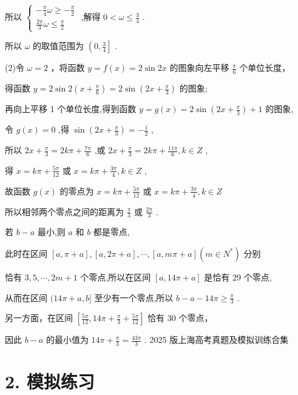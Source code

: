 \documentclass[10pt]{article}
\begin{document}
所以 \(\left\{  \begin{array}{l}  - \frac{\pi }{4}\omega  \geq   - \frac{\pi }{2} \\  \frac{2\pi }{3}\omega  \leq  \frac{\pi }{2} \end{array}\right.\) ,解得 \(0 < \omega  \leq  \frac{3}{4}\) .

所以 \(\omega\) 的取值范围为 \(\left( {0,\frac{3}{4}}\right\rbrack\) .

(2)令 \(\omega  = 2\) ，将函数 \(y = f\left( x\right)  = 2\sin {2x}\) 的图象向左平移 \(\frac{\pi }{6}\) 个单位长度，

得函数 \(y = 2\sin 2\left( {x + \frac{\pi }{6}}\right)  = 2\sin \left( {{2x} + \frac{\pi }{3}}\right)\) 的图象;

再向上平移 1 个单位长度,得到函数 \(y = g\left( x\right)  = 2\sin \left( {{2x} + \frac{\pi }{3}}\right)  + 1\) 的图象,

令 \(g\left( x\right)  = 0\) ,得 \(\sin \left( {{2x} + \frac{\pi }{3}}\right)  =  - \frac{1}{2}\) ,

所以 \({2x} + \frac{\pi }{3} = {2k\pi } + \frac{7\pi }{6}\) ,或 \({2x} + \frac{\pi }{3} = {2k\pi } + \frac{11\pi }{6},k \in  Z\) ,

得 \(x = {k\pi } + \frac{5\pi }{12}\) 或 \(x = {k\pi } + \frac{3\pi }{4},k \in  Z\) ,

故函数 \(g\left( x\right)\) 的零点为 \(x = {k\pi } + \frac{5\pi }{12}\) 或 \(x = {k\pi } + \frac{3\pi }{4},k \in  Z\)

所以相邻两个零点之间的距离为 \(\frac{\pi }{3}\) 或 \(\frac{2\pi }{3}\) .

若 \(b - a\) 最小,则 \(a\) 和 \(b\) 都是零点,

此时在区间 \(\left\lbrack  {a,\pi  + a}\right\rbrack  ,\left\lbrack  {a,{2\pi } + a}\right\rbrack  ,\cdots ,\left\lbrack  {a,{m\pi } + a}\right\rbrack  \left( {m \in  {N}^{ * }}\right)\) 分别

恰有 \(3,5,\cdots ,{2m} + 1\) 个零点,所以在区间 \(\left\lbrack  {a,{14\pi } + a}\right\rbrack\) 是恰有 29 个零点,

从而在区间 \(({14\pi } + a,b\rbrack\) 至少有一个零点,所以 \(b - a - {14\pi } \geq  \frac{\pi }{3}\) .

另一方面，在区间 \(\left\lbrack  {\frac{5\pi }{12},{14\pi } + \frac{\pi }{3} + \frac{5\pi }{12}}\right\rbrack\) 恰有 30 个零点，

因此 \(b - a\) 的最小值为 \({14\pi } + \frac{\pi }{3} = \frac{43\pi }{3}\) . 2025 版上海高考真题及模拟训练合集

\section*{2. 模拟练习}
\end{document}
